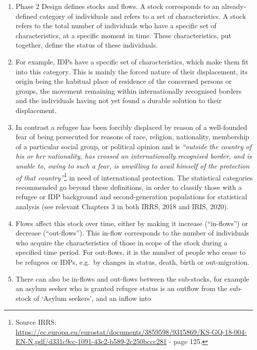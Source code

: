 \documentclass[
]{article}
\begin{document}
\begin{enumerate}
\def\labelenumi{\arabic{enumi}.}
\setcounter{enumi}{401}
\item
  Phase 2 Design defines stocks and flows. A stock corresponds to an
  already-defined category of individuals and refers to a set of
  characteristics. A stock refers to the total number of individuals
  who have a specific set of characteristics, at a specific moment in
  time. These characteristics, put together, define the status of
  these individuals.
\item
  For example, IDPs have a specific set of characteristics, which
  make them fit into this category. This is mainly the forced nature
  of their displacement, its origin being the habitual place of
  residence of the concerned persons or groups, the movement remaining
  within internationally recognised borders and the individuals having
  not yet found a durable solution to their displacement.
\item
  In contrast a refugee has been forcibly displaced by reason of a
  well-founded fear of being persecuted for reasons of race, religion,
  nationality, membership of a particular social group, or political
  opinion and is \emph{``outside the country of his or her nationality, has
  crossed an internationally recognised border, and is unable to,
  owing to such a fear, is unwilling to avail himself of the
  protection of that country''}\footnote{Source IRRS:
    \url{https://ec.europa.eu/eurostat/documents/3859598/9315869/KS-GQ-18-004-EN-N.pdf/d331c9cc-1091-43c2-b589-2c250bccc281}
    - page 125.} in need of international
  protection. The statistical categories recommended go beyond these
  definitions, in order to classify those with a refugee or IDP
  background and second-generation populations for statistical
  analysis (see relevant Chapters 3 in both IRRS, 2018 and IRIS,
  2020).
\item
  Flows affect this stock over time, either by making it increase
  (``in-flows'') or decrease (``out-flows''). This in-flow corresponds to
  the number of individuals who acquire the characteristics of those
  in scope of the stock during a specified time period. For out-flows,
  it is the number of people who cease to be refugees or IDPs, e.g.~by
  changes in status, death, birth or out-migration.
\item
  There can also be in-flows and out-flows between the sub-stocks,
  for example an asylum seeker who is granted refugee status is an
  outflow from the sub-stock of `Asylum seekers', and an inflow into

\end{enumerate}
\end{document}
